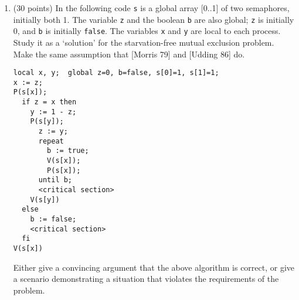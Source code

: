 \begin{enumerate}
\newpage
\item (30 points)
In the following code {\tt s} is a global array [0..1] of two
semaphores, initially both 1.  The variable {\tt z} and the boolean
{\tt b} are also global; {\tt z} is initially 0, and {\tt b} is
initially {\tt false}.  The variables {\tt x} and {\tt y} are local to
each process.  Study it as a `solution' for the starvation-free mutual
exclusion problem.  Make the same assumption that [Morris 79] and
[Udding 86] do.

\begin{verbatim}
local x, y;  global z=0, b=false, s[0]=1, s[1]=1;
x := z;
P(s[x]);
  if z = x then
    y := 1 - z;
    P(s[y]);
      z := y;
      repeat
        b := true;
        V(s[x]);
        P(s[x]);
      until b;
      <critical section>
    V(s[y])
  else
    b := false;
    <critical section>
  fi
V(s[x])
\end{verbatim}
Either give a convincing argument that the above algorithm is correct,
or give a scenario demonstrating a situation that violates the
requirements of the problem.

\end{enumerate}


